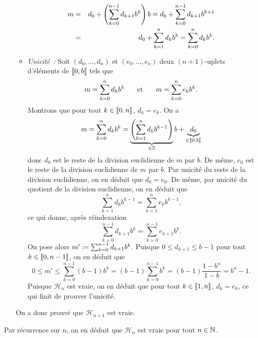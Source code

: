 \documentclass{magnoliaold}
\begin{document}
\begin{preuve}
\begin{itemize}
\begin{itemize}
\begin{eqnarray*}
m & = & d_0+\left(\sum_{k=0}^{n-1} d_{k+1} b^k\right)b = d_0+\sum_{k=0}^{n-1} d_{k+1} b^{k+1}\\
  & = & d_0+\sum_{k=1}^{n} d_{k} b^{k} = \sum_{k=0}^{n} d_{k} b^{k}.
\end{eqnarray*}
\item \emph{Unicité~:} Soit $(d_0,\ldots,d_n)$ et $(e_0,\ldots,e_n)$ deux $(n+1)$-uplets d'éléments de $\left\llbracket 0,b\right\llbracket$ tels que
\[m=\sum_{k=0}^n d_k b^k \quad\quad\!\text{et}\quad\!\quad m=\sum_{k=0}^n e_k b^k.\]
Montrons que pour tout $k\in\left\llbracket 0,n\right\rrbracket$, $d_k=e_k$. On a
\[m=\sum_{k=0}^{n} d_{k} b^{k} = \underbrace{\left(\sum_{k=1}^n d_k b^{k-1}\right)}_{\in\mathbb{Z}}b + \underbrace{d_0}_{\in\left\llbracket 0,b\right\llbracket}\]
donc $d_0$ est le reste de la division euclidienne de $m$ par $b$. De même, $e_0$ est le reste de la division euclidienne de $m$ par $b$. Par unicité du reste de la division euclidienne, on en déduit que $d_0=e_0$. De même, par unicité du quotient de la division euclidienne, on en déduit que
\[\sum_{k=1}^n d_k b^{k-1}=\sum_{k=1}^n e_k b^{k-1},\]
ce qui donne, après réindexation
\[\sum_{k=0}^{n-1} d_{k+1} b^k=\sum_{k=0}^{n-1} e_{k+1} b^k.\]
On pose alors $m'\coloneqq \sum_{k=0}^{n-1} d_{k+1} b^k$. Puisque $0\leq d_{k+1}\leq b-1$ pour tout $k\in\left\llbracket 0,n-1\right\rrbracket$, on en déduit que
\[0\leq m' \leq \sum_{k=0}^{n-1} (b-1)b^k=(b-1)\sum_{k=0}^{n-1} b^k=(b-1)\frac{1-b^n}{1-b}=b^n-1.\]
Puisque $\mathcal{H}_n$ est vraie, on en déduit que pour tout $k\in\left\llbracket 1,n\right\rrbracket$, $d_k=e_k$, ce qui finit de prouver l'unicité.
\end{itemize}
On a donc prouvé que $\mathcal{H}_{n+1}$ est vraie.
\end{itemize}
Par récurrence sur $n$, on en déduit que $\mathcal{H}_n$ est vraie pour tout $n\in\mathbb{N}$.
\end{preuve}
\end{document}
